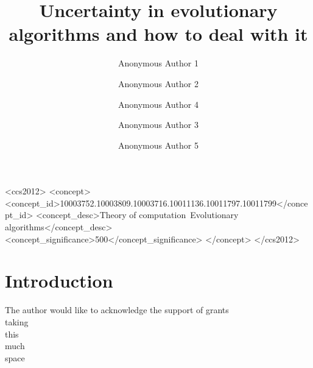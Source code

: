 \documentclass[sigconf]{acmart}
\begin{document}
\title{Uncertainty in evolutionary algorithms and how to deal with it}

\author{Anonymous Author 1}

\author{Anonymous Author 2}

\author{Anonymous Author 4}

\author{Anonymous Author 3}

\author{Anonymous Author 5}
\renewcommand{\shortauthors}{A. Author et al.}


\begin{abstract}
\end{abstract}

\begin{CCSXML}
<ccs2012>
<concept>
<concept_id>10003752.10003809.10003716.10011136.10011797.10011799</concept_id>
<concept_desc>Theory of computation~Evolutionary algorithms</concept_desc>
<concept_significance>500</concept_significance>
</concept>
</ccs2012>
\end{CCSXML}




\maketitle


\section{Introduction}



\begin{acks}

  The author would like to acknowledge the support of grants\\
  taking\\
  this\\
  much\\
  space\\

\end{acks}




\end{document}

